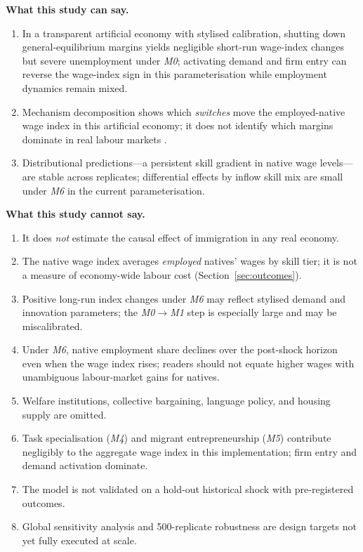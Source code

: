 \documentclass[11pt,a4paper]{article}
\begin{document}
\textbf{What this study can say.}
\begin{enumerate}[label=(\roman*), nosep]
  \item In a transparent artificial economy with stylised calibration, shutting down general-equilibrium margins yields negligible short-run wage-index changes but severe unemployment under \emph{M0}; activating demand and firm entry can reverse the wage-index sign in this parameterisation while employment dynamics remain mixed.
  \item Mechanism decomposition shows which \emph{switches} move the employed-native wage index in this artificial economy; it does not identify which margins dominate in real labour markets \citep{borjas2016,cadenakovak2016,albert2021}.
  \item Distributional predictions---a persistent skill gradient in native wage levels---are stable across replicates; differential effects by inflow skill mix are small under \emph{M6} in the current parameterisation.
\end{enumerate}

\textbf{What this study cannot say.}
\begin{enumerate}[label=(\roman*), nosep]
  \item It does \emph{not} estimate the causal effect of immigration in any real economy.
  \item The native wage index averages \emph{employed} natives' wages by skill tier; it is not a measure of economy-wide labour cost (Section~\ref{sec:outcomes}).
  \item Positive long-run index changes under \emph{M6} may reflect stylised demand and innovation parameters; the \emph{M0}$\rightarrow$\emph{M1} step is especially large and may be miscalibrated.
  \item Under \emph{M6}, native employment share declines over the post-shock horizon even when the wage index rises; readers should not equate higher wages with unambiguous labour-market gains for natives.
  \item Welfare institutions, collective bargaining, language policy, and housing supply are omitted.
  \item Task specialisation (\emph{M4}) and migrant entrepreneurship (\emph{M5}) contribute negligibly to the aggregate wage index in this implementation; firm entry and demand activation dominate.
  \item The model is not validated on a hold-out historical shock with pre-registered outcomes.
  \item Global sensitivity analysis and 500-replicate robustness are design targets not yet fully executed at scale.
\end{enumerate}
\end{document}
